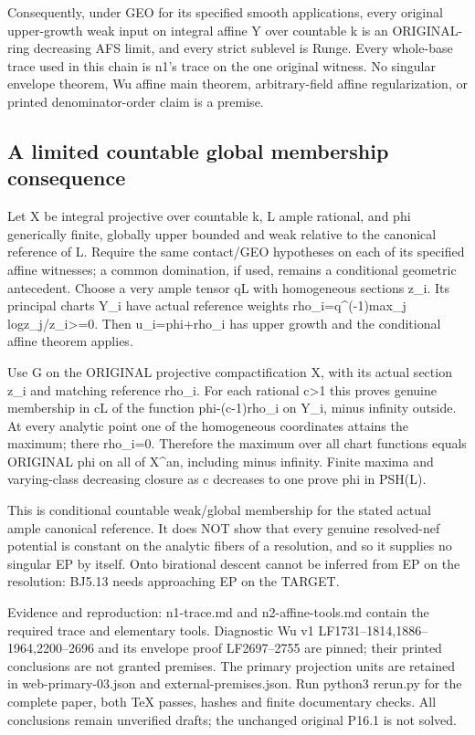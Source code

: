 \documentclass[
  10pt,
]{article}
\begin{document}
Consequently, under GEO for its specified smooth applications, every
original upper-growth weak input on integral affine Y over countable k
is an ORIGINAL-ring decreasing AFS limit, and every strict sublevel is
Runge. Every whole-base trace used in this chain is n1's trace on the
one original witness. No singular envelope theorem, Wu affine main
theorem, arbitrary-field affine regularization, or printed
denominator-order claim is a premise.

\subsection{A limited countable global membership
consequence}\label{a-limited-countable-global-membership-consequence}

Let X be integral projective over countable k, L ample rational, and phi
generically finite, globally upper bounded and weak relative to the
canonical reference of L. Require the same contact/GEO hypotheses on
each of its specified affine witnesses; a common domination, if used,
remains a conditional geometric antecedent. Choose a very ample tensor
qL with homogeneous sections z\_i. Its principal charts Y\_i have actual
reference weights rho\_i=q\^{}(-1)max\_j
log\textbar z\_j/z\_i\textbar\textgreater=0. Then u\_i=phi+rho\_i has
upper growth and the conditional affine theorem applies.

Use G on the ORIGINAL projective compactification X, with its actual
section z\_i and matching reference rho\_i. For each rational
c\textgreater1 this proves genuine membership in cL of the function
phi-(c-1)rho\_i on Y\_i, minus infinity outside. At every analytic point
one of the homogeneous coordinates attains the maximum; there rho\_i=0.
Therefore the maximum over all chart functions equals ORIGINAL phi on
all of X\^{}an, including minus infinity. Finite maxima and
varying-class decreasing closure as c decreases to one prove phi in
PSH(L).

This is conditional countable weak/global membership for the stated
actual ample canonical reference. It does NOT show that every genuine
resolved-nef potential is constant on the analytic fibers of a
resolution, and so it supplies no singular EP by itself. Onto birational
descent cannot be inferred from EP on the resolution: BJ5.13 needs
approaching EP on the TARGET.

Evidence and reproduction: n1-trace.md and n2-affine-tools.md contain
the required trace and elementary tools. Diagnostic Wu v1
LF1731--1814,1886--1964,2200--2696 and its envelope proof LF2697--2755
are pinned; their printed conclusions are not granted premises. The
primary projection units are retained in web-primary-03.json and
external-premises.json. Run python3 rerun.py for the complete paper,
both TeX passes, hashes and finite documentary checks. All conclusions
remain unverified drafts; the unchanged original P16.1 is not solved.
\end{document}
